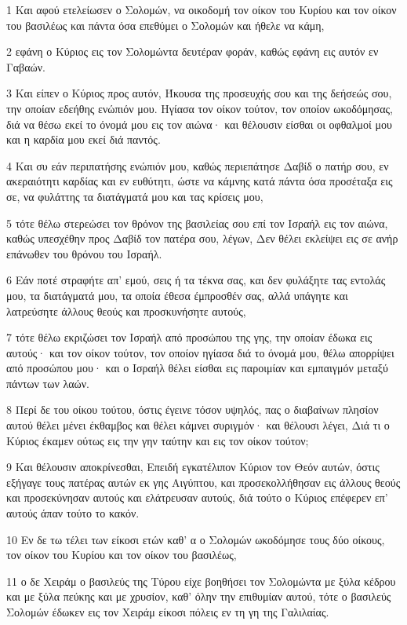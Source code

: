 \par 1 Και αφού ετελείωσεν ο Σολομών, να οικοδομή τον οίκον του Κυρίου και τον οίκον του βασιλέως και πάντα όσα επεθύμει ο Σολομών και ήθελε να κάμη,
\par 2 εφάνη ο Κύριος εις τον Σολομώντα δευτέραν φοράν, καθώς εφάνη εις αυτόν εν Γαβαών.
\par 3 Και είπεν ο Κύριος προς αυτόν, Ήκουσα της προσευχής σου και της δεήσεώς σου, την οποίαν εδεήθης ενώπιόν μου. Ηγίασα τον οίκον τούτον, τον οποίον ωκοδόμησας, διά να θέσω εκεί το όνομά μου εις τον αιώνα· και θέλουσιν είσθαι οι οφθαλμοί μου και η καρδία μου εκεί διά παντός.
\par 4 Και συ εάν περιπατήσης ενώπιόν μου, καθώς περιεπάτησε Δαβίδ ο πατήρ σου, εν ακεραιότητι καρδίας και εν ευθύτητι, ώστε να κάμνης κατά πάντα όσα προσέταξα εις σε, να φυλάττης τα διατάγματά μου και τας κρίσεις μου,
\par 5 τότε θέλω στερεώσει τον θρόνον της βασιλείας σου επί τον Ισραήλ εις τον αιώνα, καθώς υπεσχέθην προς Δαβίδ τον πατέρα σου, λέγων, Δεν θέλει εκλείψει εις σε ανήρ επάνωθεν του θρόνου του Ισραήλ.
\par 6 Εάν ποτέ στραφήτε απ' εμού, σεις ή τα τέκνα σας, και δεν φυλάξητε τας εντολάς μου, τα διατάγματά μου, τα οποία έθεσα έμπροσθέν σας, αλλά υπάγητε και λατρεύσητε άλλους θεούς και προσκυνήσητε αυτούς,
\par 7 τότε θέλω εκριζώσει τον Ισραήλ από προσώπου της γης, την οποίαν έδωκα εις αυτούς· και τον οίκον τούτον, τον οποίον ηγίασα διά το όνομά μου, θέλω απορρίψει από προσώπου μου· και ο Ισραήλ θέλει είσθαι εις παροιμίαν και εμπαιγμόν μεταξύ πάντων των λαών.
\par 8 Περί δε του οίκου τούτου, όστις έγεινε τόσον υψηλός, πας ο διαβαίνων πλησίον αυτού θέλει μένει έκθαμβος και θέλει κάμνει συριγμόν· και θέλουσι λέγει, Διά τι ο Κύριος έκαμεν ούτως εις την γην ταύτην και εις τον οίκον τούτον;
\par 9 Και θέλουσιν αποκρίνεσθαι, Επειδή εγκατέλιπον Κύριον τον Θεόν αυτών, όστις εξήγαγε τους πατέρας αυτών εκ γης Αιγύπτου, και προσεκολλήθησαν εις άλλους θεούς και προσεκύνησαν αυτούς και ελάτρευσαν αυτούς, διά τούτο ο Κύριος επέφερεν επ' αυτούς άπαν τούτο το κακόν.
\par 10 Εν δε τω τέλει των είκοσι ετών καθ' α ο Σολομών ωκοδόμησε τους δύο οίκους, τον οίκον του Κυρίου και τον οίκον του βασιλέως,
\par 11 ο δε Χειράμ ο βασιλεύς της Τύρου είχε βοηθήσει τον Σολομώντα με ξύλα κέδρου και με ξύλα πεύκης και με χρυσίον, καθ' όλην την επιθυμίαν αυτού, τότε ο βασιλεύς Σολομών έδωκεν εις τον Χειράμ είκοσι πόλεις εν τη γη της Γαλιλαίας.
